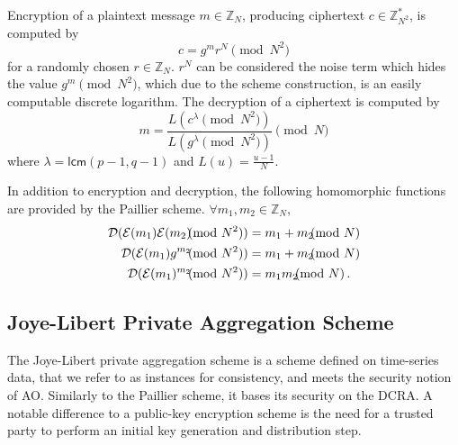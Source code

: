 \documentclass[twocolumn]{autart}
\begin{document}
Encryption of a plaintext message $m \in \mathbb{Z}_N$, producing ciphertext $c \in \mathbb{Z}^{*}_{N^2}$, is computed by
\begin{equation}
    c = g^m r^N \pmod{N^2}
\end{equation}
for a randomly chosen $r \in \mathbb{Z}_{N}$. $r^N$ can be considered the noise term which hides the value $g^m \pmod{N^2}$, which due to the scheme construction, is an easily computable discrete logarithm. The decryption of a ciphertext is computed by
\begin{equation}
    m = \frac{L(c^\lambda\pmod{N^2})}{L(g^\lambda\pmod{N^2})} \pmod{N}
\end{equation}
where $\lambda = \mathsf{lcm}(p-1, q-1)$ and $L(u) = \frac{u-1}{N}$.

In addition to encryption and decryption, the following homomorphic functions are provided by the Paillier scheme. $\forall m_1,m_2 \in \mathbb{Z}_N$,
\begin{align}
    \mathcal{D}(\mathcal{E}(m_1)\mathcal{E}(m_2) \hspace{-7pt} \pmod{N^2}) &= m_1+m_2 \hspace{-7pt} \pmod{N} \\
    \mathcal{D}(\mathcal{E}(m_1)g^{m_2} \hspace{-7pt} \pmod{N^2}) &= m_1+m_2\hspace{-7pt}\pmod{N} \label{eqn:paillier_hom_plain_add}\\
    \mathcal{D}(\mathcal{E}(m_1)^{m_2} \hspace{-7pt} \pmod{N^2}) &= m_1m_2 \hspace{-7pt} \pmod{N}\,. \label{eqn:paillier_hom_mult}
\end{align}

% 
% 

\subsection{Joye-Libert Private Aggregation Scheme} \label{subsec:joye_libert_scheme}
The Joye-Libert private aggregation scheme \cite{joyeScalableSchemePrivacyPreserving2013} is a scheme defined on time-series data, that we refer to as instances for consistency, and meets the security notion of AO. Similarly to the Paillier scheme, it bases its security on the DCRA. A notable difference to a public-key encryption scheme is the need for a trusted party to perform an initial key generation and distribution step.
\end{document}
